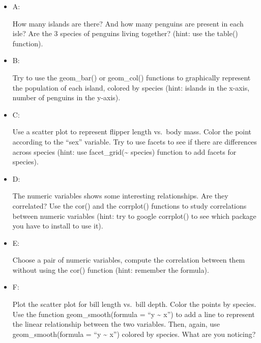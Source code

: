 \documentclass[
]{article}
\begin{document}
\begin{itemize}
\item
  A:

  How many islands are there? And how many penguins are present in each
  isle? Are the 3 species of penguins living together? (hint: use the
  table() function).
\item
  B:

  Try to use the geom\_bar() or geom\_col() functions to graphically
  represent the population of each island, colored by species (hint:
  islands in the x-axis, number of penguins in the y-axis).
\item
  C:

  Use a scatter plot to represent flipper length vs.~body mass. Color
  the point according to the ``sex'' variable. Try to use facets to see
  if there are differences across species (hint: use
  facet\_grid(\textasciitilde{} species) function to add facets for
  species).
\item
  D:

  The numeric variables shows some interesting relationships. Are they
  correlated? Use the cor() and the corrplot() functions to study
  correlations between numeric variables (hint: try to google corrplot()
  to see which package you have to install to use it).
\item
  E:

  Choose a pair of numeric variables, compute the correlation between
  them without using the cor() function (hint: remember the formula).
\item
  F:

  Plot the scatter plot for bill length vs.~bill depth. Color the points
  by species. Use the function geom\_smooth(formula = ``y
  \textasciitilde{} x'') to add a line to represent the linear
  relationship between the two variables. Then, again, use
  geom\_smooth(formula = ``y \textasciitilde{} x'') colored by species.
  What are you noticing?
\end{itemize}
\end{document}
